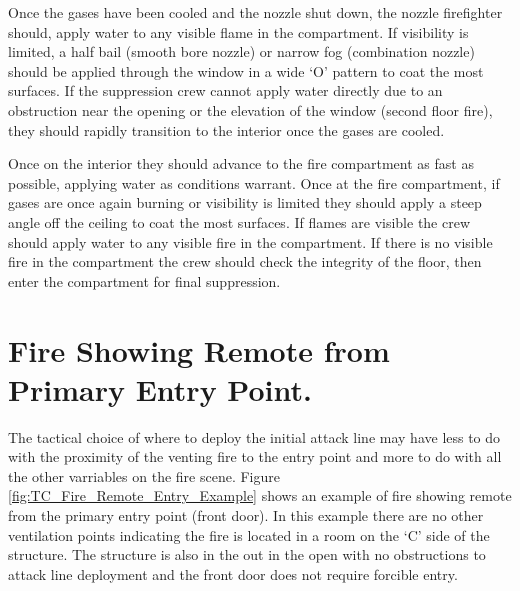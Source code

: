\documentclass[12pt,oneside]{book}
\begin{document}
Once the gases have been cooled and the nozzle shut down, the nozzle firefighter should, apply water to any visible flame in the compartment. If visibility is limited, a half bail (smooth bore nozzle) or narrow fog (combination nozzle) should be applied through the window in a wide `O' pattern to coat the most surfaces. If the suppression crew cannot apply water directly due to an obstruction near the opening or the elevation of the window (second floor fire), they should rapidly transition to the interior once the gases are cooled. 

Once on the interior they should advance to the fire compartment as fast as possible, applying water as conditions warrant. Once at the fire compartment, if gases are once again burning or visibility is limited they should apply a steep angle off the ceiling to coat the most surfaces. If flames are visible the crew should apply water to any visible fire in the compartment. If there is no visible fire in the compartment the crew should check the integrity of the floor, then enter the compartment for final suppression. 

\section{Fire Showing Remote from Primary Entry Point.}
The tactical choice of where to deploy the initial attack line may have less to do with the proximity of the venting fire to the entry point and more to do with all the other varriables on the fire scene. Figure \ref{fig:TC_Fire_Remote_Entry_Example} shows an example of fire showing remote from the primary entry point (front door). In this example there are no other ventilation points indicating the fire is located in a room on the `C' side of the structure. The structure is also in the out in the open with no obstructions to attack line deployment and the front door does not require forcible entry. 
\end{document}
